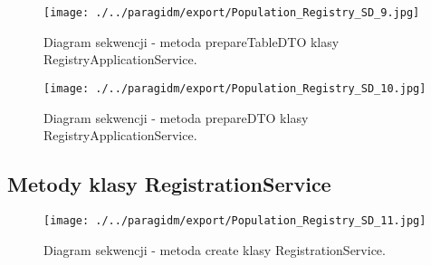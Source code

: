 \documentclass[12pt]{article}
\begin{document}
\begin{figure}[H]
    \centering
    \texttt{[image: ./../paragidm/export/Population\_Registry\_SD\_9.jpg]}
    \caption{Diagram sekwencji - metoda prepareTableDTO klasy RegistryApplicationService.}
    \label{}
\end{figure}


\begin{figure}[H]
    \centering
    \texttt{[image: ./../paragidm/export/Population\_Registry\_SD\_10.jpg]}
    \caption{Diagram sekwencji - metoda prepareDTO klasy RegistryApplicationService.}
    \label{}
\end{figure}




\subsection{Metody klasy RegistrationService}
\begin{figure}[H]
    \centering
    \texttt{[image: ./../paragidm/export/Population\_Registry\_SD\_11.jpg]}
    \caption{Diagram sekwencji - metoda create klasy RegistrationService.}
    \label{}
\end{figure}

\clearpage
\end{document}
